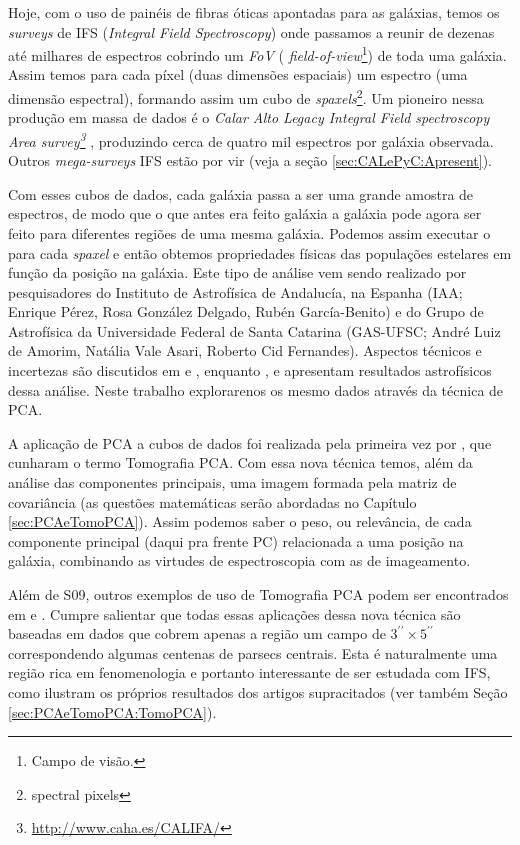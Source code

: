 Hoje, com o uso de painéis de fibras óticas apontadas para as galáxias, temos os {\em surveys} de IFS ({\em Integral
Field Spectroscopy}) onde passamos a reunir de dezenas até milhares de espectros cobrindo um {\em FoV} ({\em
field-of-view}\footnote{Campo de visão.}) de toda uma galáxia. Assim temos para cada píxel (duas dimensões espaciais) um
espectro (uma dimensão espectral), formando assim um cubo de {\em spaxels}\footnote{spectral pixels}. Um pioneiro nessa
produção em massa de dados é o {\em Calar Alto Legacy Integral Field spectroscopy Area
survey\footnote{\url{http://www.caha.es/CALIFA/}}} \citep[CALIFA; ][]{CALIFAPresent2012}, produzindo cerca de quatro mil
espectros por galáxia observada. Outros {\em mega-surveys} IFS estão por vir (veja a seção \ref{sec:CALePyC:Apresent}).

Com esses cubos de dados, cada galáxia passa a ser uma grande amostra de espectros, de modo que o que antes era feito
galáxia a galáxia pode agora ser feito para diferentes regiões de uma mesma galáxia. Podemos assim executar o \starlight
para cada {\em spaxel} e então obtemos propriedades físicas das populações estelares em função da posição na galáxia.
Este tipo de análise vem sendo realizado por pesquisadores do Instituto de Astrofísica de Andalucía, na Espanha (IAA;
Enrique Pérez, Rosa González Delgado, Rubén García-Benito) e do Grupo de Astrofísica da Universidade Federal de Santa
Catarina (GAS-UFSC; André Luiz de Amorim, Natália Vale Asari, Roberto Cid Fernandes). Aspectos técnicos e incertezas são
discutidos em \citet[][CF13 daqui pra frente]{CidFernandes2013} e \citet{CidFernandes2014}, enquanto \citet{Perez2013},
e \citet{GonzalezDelgado2014} apresentam resultados astrofísicos dessa análise. Neste trabalho explorarenos os mesmo
dados através da técnica de PCA.

A aplicação de PCA a cubos de dados foi realizada pela primeira vez por \citet[][S09 daqui pra frente]{Steiner2009}, que
cunharam o termo Tomografia PCA. Com essa nova técnica temos, além da análise das componentes principais, uma imagem
formada pela matriz de covariância (as questões matemáticas serão abordadas no Capítulo \ref{sec:PCAeTomoPCA}). Assim
podemos saber o peso, ou relevância, de cada componente principal (daqui pra frente PC) relacionada a uma posição na
galáxia, combinando as virtudes de espectroscopia com as de imageamento.

Além de S09, outros exemplos de uso de Tomografia PCA podem ser encontrados em \citet{Riffel2011} e \citet{Ricci2011}.
Cumpre salientar que todas essas aplicações dessa nova técnica são baseadas em dados que cobrem apenas a região um campo
de $3^{\prime\prime} \times 5^{\prime\prime}$ correspondendo algumas centenas de parsecs centrais. Esta é naturalmente
uma região rica em fenomenologia e portanto interessante de ser estudada com IFS, como ilustram os próprios resultados
dos artigos supracitados (ver também Seção \ref{sec:PCAeTomoPCA:TomoPCA}).

